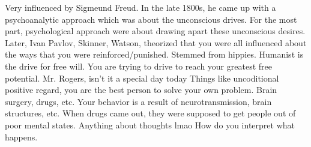 \markdownRendererInterblockSeparator
{}\markdownRendererInterblockSeparator
{}\markdownRendererUlBeginTight
\markdownRendererUlItem Very influenced by Sigmeund Freud.\markdownRendererUlItemEnd 
\markdownRendererUlItem In the late 1800s, he came up with a psychoanalytic approach which was about the unconscious drives.\markdownRendererUlItemEnd 
\markdownRendererUlItem For the most part, psychological approach were about drawing apart these unconscious desires.\markdownRendererUlItemEnd 
\markdownRendererUlEndTight \markdownRendererInterblockSeparator
{}\markdownRendererInterblockSeparator
{}\markdownRendererUlBeginTight
\markdownRendererUlItem Later, Ivan Pavlov, Skinner, Watson, theorized that you were all influenced about the ways that you were reinforced/punished.\markdownRendererUlItemEnd 
\markdownRendererUlEndTight \markdownRendererInterblockSeparator
{}\markdownRendererInterblockSeparator
{}\markdownRendererUlBeginTight
\markdownRendererUlItem Stemmed from hippies.\markdownRendererUlItemEnd 
\markdownRendererUlItem Humanist is the drive for free will.\markdownRendererUlItemEnd 
\markdownRendererUlItem You are trying to drive to reach your greatest free potential.\markdownRendererUlItemEnd 
\markdownRendererUlEndTight \markdownRendererInterblockSeparator
{}\markdownRendererBlockQuoteBegin
Mr. Rogers, isn't it a special day today
\markdownRendererBlockQuoteEnd \markdownRendererInterblockSeparator
{}\markdownRendererUlBeginTight
\markdownRendererUlItem Things like uncoditional positive regard, you are the best person to solve your own problem.\markdownRendererUlItemEnd 
\markdownRendererUlEndTight \markdownRendererInterblockSeparator
{}\markdownRendererInterblockSeparator
{}\markdownRendererUlBeginTight
\markdownRendererUlItem Brain surgery, drugs, etc.\markdownRendererUlItemEnd 
\markdownRendererUlItem Your behavior is a result of neurotransmission, brain structures, etc.\markdownRendererUlItemEnd 
\markdownRendererUlItem When drugs came out, they were supposed to get people out of poor mental states.\markdownRendererUlItemEnd 
\markdownRendererUlEndTight \markdownRendererInterblockSeparator
{}\markdownRendererInterblockSeparator
{}\markdownRendererUlBeginTight
\markdownRendererUlItem Anything about thoughts lmao\markdownRendererUlItemEnd 
\markdownRendererUlItem How do you interpret what happens.\markdownRendererUlItemEnd 
